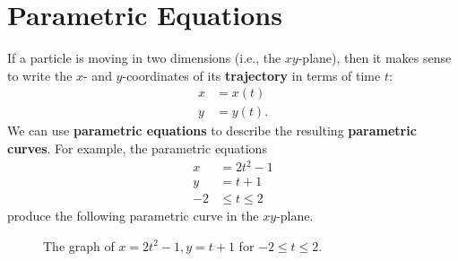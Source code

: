 \documentclass[10pt,]{book}
\newcommand{\terminology}[1]{\textbf{#1}}
\numberwithin{equation}{section}
\newcommand{\amp}{&}
\begin{document}
\section[{Parametric Equations}]{Parametric Equations}\label{section-parametric-equations}
\hypertarget{p-988}{}%
If a particle is moving in two dimensions (i.e., the \(xy\)-plane), then it makes sense to write the \(x\)- and \(y\)-coordinates of its \terminology{trajectory} in terms of time \(t\):%
\begin{align*}
x \amp = x(t) \\
y \amp = y(t) \text{.}
\end{align*}
We can use \terminology{parametric equations} to describe the resulting \terminology{parametric curves}. For example, the parametric equations%
%
\begin{align*}
x \amp = 2t^{2}-1 \\
y \amp = t+1 \\
-2 \amp \leq t\leq 2 
\end{align*}
\hypertarget{p-989}{}%
produce the following parametric curve in the \(xy\)-plane.%
\begin{figure}
\centering
{
}
\caption{The graph of \(x = 2t^2-1, y=t+1\) for \(-2\leq t\leq 2\).\label{figure-parametric-parabola}}
\end{figure}
\end{document}
